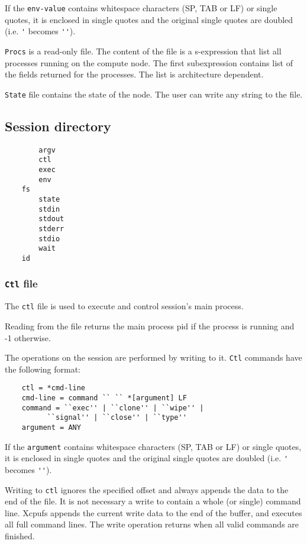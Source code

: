 \documentclass[draft]{article}
\begin{document}
If the \verb|env-value| contains whitespace characters (SP, TAB or LF) or
single quotes, it is enclosed in single quotes and the original single
quotes are doubled (i.e. \verb|'| becomes \verb|''|).

\verb|Procs| is a read-only file. The content of the file is a s-expression
that list all processes running on the compute node. The first subexpression
contains list of the fields returned for the processes. The list is
architecture dependent.

\verb|State| file contains the state of the node. The user can write any
string to the file.  

\subsection{Session directory}

\begin{verbatim}
        argv
        ctl
        exec
        env
	fs
        state
        stdin
        stdout
        stderr
        stdio
        wait
	id
\end{verbatim}

\subsubsection{{\tt Ctl} file}

The \verb|ctl| file is used to execute and control session's main process.

Reading from the file returns the main process pid if the process is running
and -1 otherwise.

The operations on the session are performed by writing to it. \verb|Ctl|
commands have the following format:

\begin{verbatim}
	ctl = *cmd-line
	cmd-line = command `` `` *[argument] LF
	command = ``exec'' | ``clone'' | ``wipe'' | 
		  ``signal'' | ``close'' | ``type''
	argument = ANY
\end{verbatim}

If the \verb|argument| contains whitespace characters (SP, TAB or LF) or single
quotes, it is enclosed in single quotes and the original single quotes are
doubled (i.e. \verb|'| becomes \verb|''|).

Writing to \verb|ctl| ignores the specified offset and always appends the
data to the end of the file. It is not necessary a write to contain a whole
(or single) command line. Xcpufs appends the current write data to the end
of the buffer, and executes all full command lines. The write operation
returns when all valid commands are finished.
\end{document}
